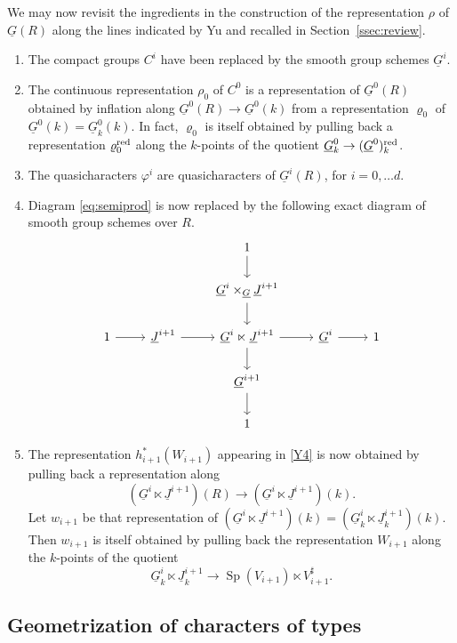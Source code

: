 \documentclass[10pt]{amsart}
\makeatletter
\theoremstyle{plain}
\theoremstyle{definition}
\newcommand{\Fq}{k}
\newcommand{\labitem}[2]{
\def\@itemlabel{\textbf{#1}}
\item
\def\@currentlabel{#1}\label{#2}}
\newcommand{\Sp}{{\operatorname{Sp}}}
\makeatother
\begin{document}
We may now revisit the ingredients in the construction of the representation $\rho$ of $\underline{G}(R)$ along the lines indicated by Yu and recalled in Section~\ref{ssec:review}.
\begin{enumerate}
\labitem{M0}{M0}
The compact groups $C^i$ have been replaced by the smooth group schemes $\underline{G}^i$.
\labitem{M1}{M1}
The continuous representation $\rho_0$ of $C^0$ is a representation of $\underline{G}^0(R)$ obtained by inflation along $\underline{G}^0(R) \to \underline{G}^0(\Fq)$ from a representation $\varrho_0$ of $\underline{G}^0(\Fq) = \underline{G}^0_\Fq(\Fq)$.
In fact, $\varrho_0$ is itself obtained by pulling back a representation $\varrho_0^{\operatorname{red}}$ along the $\Fq$-points of the quotient $\underline{G}^0_\Fq \to (\underline{G}^0)_\Fq^\reductive$.
\labitem{M2}{M2} The quasicharacters $\varphi^i$ are quasicharacters of $\underline{G}^i(R)$, for $i=0, \ldots d$.
\labitem{M3}{M3}
Diagram \eqref{eq:semiprod} is now replaced by the following exact diagram of smooth group schemes over $R$.
\begin{equation}\label{eq:pimodel}
\begin{tikzcd}
\ && 1 \arrow{d} && \\
\ && \underline{G}^{i}\times_{\underline{G}} \underline{J}^{i+1}\arrow{d} && \\
1 \arrow{r} & \underline{J}^{i+1} \arrow{r} & \underline{G}^i \ltimes \underline{J}^{i+1} \arrow{d} \arrow{r} & \underline{G}^i \arrow{r} & 1\\
&& \underline{G}^{i+1} \arrow{d} && \\
&& 1 &&
\end{tikzcd}
\end{equation}
\labitem{M4}{M4}
The representation $h_{i+1}^*(W_{i+1})$ appearing in \ref{Y4} is now obtained by pulling back a representation along 
\[
(\underline{G}^i \ltimes \underline{J}^{i+1})(R) \to (\underline{G}^i \ltimes \underline{J}^{i+1})(\Fq).
\]
Let $w_{i+1}$ be that representation of $(\underline{G}^i \ltimes \underline{J}^{i+1})(\Fq) = (\underline{G}_\Fq^i \ltimes \underline{J}^{i+1}_\Fq)(\Fq)$. 
Then $w_{i+1}$ is itself obtained by pulling back the representation $W_{i+1}$ along the $\Fq$-points of the quotient
\[
\underline{G}_\Fq^i \ltimes \underline{J}^{i+1}_\Fq \to 
\Sp(V_{i+1}) \ltimes V_{i+1}^\sharp.
\]
\end{enumerate}

\subsection{Geometrization of characters of types}\label{ssec:geotypes}
\end{document}
